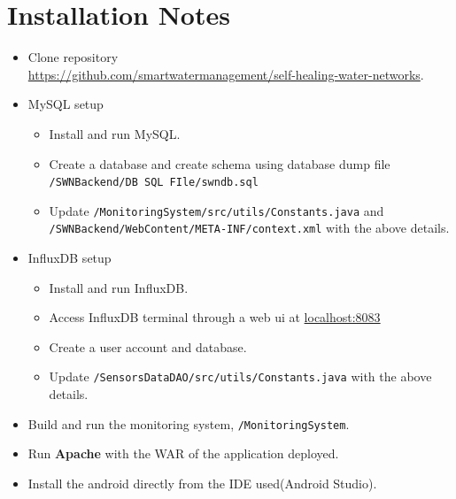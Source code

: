 \documentclass[11pt]{report} %
\begin{document}
\chapter{Installation Notes}
\begin{itemize}
\item Clone repository \\ \url {https://github.com/smartwatermanagement/self-healing-water-networks}.
\item MySQL setup
\begin{itemize}
\item Install and run MySQL. 
\item Create a database and create schema using database dump file  \texttt{/SWNBackend/DB SQL FIle/swndb.sql}
\item Update \texttt{/MonitoringSystem/src/utils/Constants.java} and \\ \texttt{/SWNBackend/WebContent/META-INF/context.xml} with the above details.
\end{itemize}
\item InfluxDB setup
\begin{itemize}
\item Install and run InfluxDB.
\item Access InfluxDB terminal through a web ui at \url {localhost:8083}
\item Create a user account and database.
\item Update \texttt{/SensorsDataDAO/src/utils/Constants.java} with the above details.
\end{itemize}
\item Build and run the monitoring system, \texttt{/MonitoringSystem}.
\item Run \textbf{Apache} with the WAR of the application deployed.
\item Install the android directly from the IDE used(Android Studio).
\end{itemize}
\end{document}
